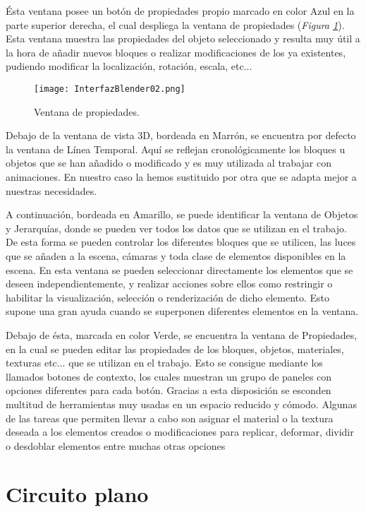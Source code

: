 Ésta ventana posee un botón de propiedades propio marcado en color Azul en la parte superior derecha, el cual despliega la ventana de propiedades (\textit{Figura \ref{fig:interfazblender02}}). Esta ventana muestra las propiedades del objeto seleccionado y resulta muy útil a la hora de añadir nuevos bloques o realizar modificaciones de los ya existentes, pudiendo modificar la localización, rotación, escala, etc...

\begin{figure}[h]
	\centering
	\texttt{[image: InterfazBlender02.png]}
	\caption{Ventana de propiedades.} \label{fig:interfazblender02}
\end{figure}

Debajo de la ventana de vista 3D, bordeada en Marrón, se encuentra por defecto la ventana de Línea Temporal. Aquí se reflejan cronológicamente los bloques u objetos que se han añadido o modificado y es muy utilizada al trabajar con animaciones. En nuestro caso la hemos sustituido por otra que se adapta mejor a nuestras necesidades.

A continuación, bordeada en Amarillo, se puede identificar la ventana de Objetos y Jerarquías, donde se pueden ver todos los datos que se utilizan en el trabajo. De esta forma se pueden controlar los diferentes bloques que se utilicen, las luces que se añaden a la escena, cámaras y toda clase de elementos disponibles en la escena. En esta ventana se pueden seleccionar directamente los elementos que se deseen independientemente, y realizar acciones sobre ellos como restringir o habilitar la visualización, selección o renderización de dicho elemento. Esto supone una gran ayuda cuando se superponen diferentes elementos en la ventana.

Debajo de ésta, marcada en color Verde, se encuentra la ventana de Propiedades, en la cual se pueden editar las propiedades de los bloques, objetos, materiales, texturas etc... que se utilizan en el trabajo. Esto se consigue mediante los llamados botones de contexto, los cuales muestran un grupo de paneles con opciones diferentes para cada botón. Gracias a esta disposición se esconden multitud de herramientas muy usadas en un espacio reducido y cómodo. Algunas de las tareas que permiten llevar a cabo son asignar el material o la textura deseada a los elementos creados o modificaciones para replicar, deformar, dividir o desdoblar elementos entre muchas otras opciones

\section{Circuito plano}
\label{sec:pm_circuitoplano}

